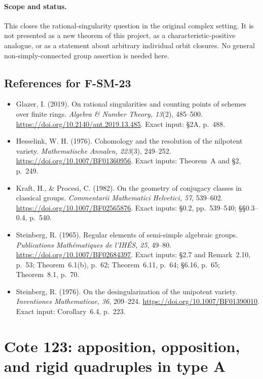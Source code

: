 \documentclass[11pt,a4paper]{article}
\theoremstyle{definition}\newtheorem{definition}[theorem]{Definition}
\theoremstyle{remark}\newtheorem{remark}[theorem]{Remark}
\begin{document}
\paragraph{Scope and status.}
This closes the rational-singularity question in the original
complex setting.  It is not presented as a new theorem of this
project, as a characteristic-positive analogue, or as a statement
about arbitrary individual orbit closures.  No general
non-simply-connected group assertion is needed here.

\subsection*{References for F-SM-23}
\begin{itemize}
\item Glazer, I. (2019). On rational singularities and counting points
of schemes over finite rings. \emph{Algebra \& Number Theory, 13}(2),
485--500. \url{https://doi.org/10.2140/ant.2019.13.485}.
Exact input: \S2A, p.~488.
\item Hesselink, W. H. (1976). Cohomology and the resolution of the
nilpotent variety. \emph{Mathematische Annalen, 223}(3), 249--252.
\url{https://doi.org/10.1007/BF01360956}.
Exact inputs: Theorem~A and \S2, p.~249.
\item Kraft, H., \& Procesi, C. (1982). On the geometry of conjugacy
classes in classical groups. \emph{Commentarii Mathematici
Helvetici, 57}, 539--602.
\url{https://doi.org/10.1007/BF02565876}.
Exact inputs: \S0.2, pp.~539--540; \S\S0.3--0.4, p.~540.
\item Steinberg, R. (1965). Regular elements of semi-simple algebraic
groups. \emph{Publications Math\'ematiques de l'IH\'ES, 25}, 49--80.
\url{https://doi.org/10.1007/BF02684397}.
Exact inputs: \S2.7 and Remark~2.10, p.~53;
Theorem~6.1(b), p.~62; Theorem~6.11, p.~64;
\S6.16, p.~65; Theorem~8.1, p.~70.
\item Steinberg, R. (1976). On the desingularization of the unipotent
variety. \emph{Inventiones Mathematicae, 36}, 209--224.
\url{https://doi.org/10.1007/BF01390010}.
Exact input: Corollary~6.4, p.~223.
\end{itemize}


\section{Cote 123: apposition, opposition, and rigid quadruples in type
A}\label{cote-123-apposition-opposition-and-rigid-quadruples-in-type-a}
\end{document}
